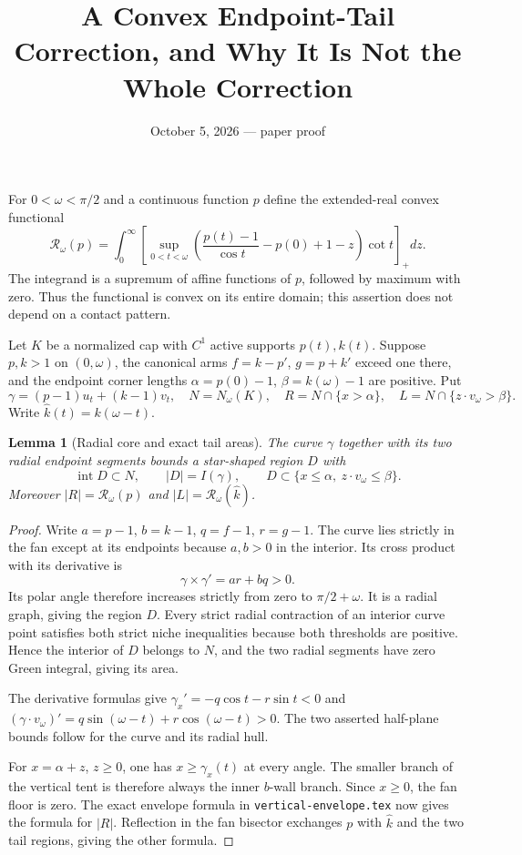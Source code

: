 \documentclass[11pt]{article}
\title{A Convex Endpoint-Tail Correction, and Why It Is Not the Whole Correction}
\author{}\date{October 5, 2026 --- paper proof}
\newtheorem{lemma}{Lemma}
\begin{document}
\maketitle
For $0<\omega<\pi/2$ and a continuous function $p$ define the extended-real convex functional
\[
 \mathcal R_\omega(p)=\int_0^\infty\left[
 \sup_{0<t<\omega}\left(\frac{p(t)-1}{\cos t}-p(0)+1-z\right)\cot t
 \right]_+dz.
\]
The integrand is a supremum of affine functions of $p$, followed by maximum with zero. Thus the functional is convex on its entire domain; this assertion does not depend on a contact pattern.

Let $K$ be a normalized cap with $C^1$ active supports $p(t),k(t)$. Suppose $p,k>1$ on $(0,\omega)$, the canonical arms $f=k-p'$, $g=p+k'$ exceed one there, and the endpoint corner lengths $\alpha=p(0)-1$, $\beta=k(\omega)-1$ are positive. Put
\[
 \gamma=(p-1)u_t+(k-1)v_t,\quad N=N_\omega(K),\quad
 R=N\cap\{x>\alpha\},\quad L=N\cap\{z\cdot v_\omega>\beta\}.
\]
Write $\widehat k(t)=k(\omega-t)$.

\begin{lemma}[Radial core and exact tail areas]
The curve $\gamma$ together with its two radial endpoint segments bounds a star-shaped region $D$ with
\[
 \operatorname{int}D\subset N,\qquad |D|=I(\gamma),\qquad
 D\subset\{x\le\alpha,\ z\cdot v_\omega\le\beta\}.
\]
Moreover $|R|=\mathcal R_\omega(p)$ and $|L|=\mathcal R_\omega(\widehat k)$.
\end{lemma}
\begin{proof}
Write $a=p-1$, $b=k-1$, $q=f-1$, $r=g-1$. The curve lies strictly in the fan except at its endpoints because $a,b>0$ in the interior. Its cross product with its derivative is
\[
 \gamma\times\gamma'=ar+bq>0.
\]
Its polar angle therefore increases strictly from zero to $\pi/2+\omega$. It is a radial graph, giving the region $D$. Every strict radial contraction of an interior curve point satisfies both strict niche inequalities because both thresholds are positive. Hence the interior of $D$ belongs to $N$, and the two radial segments have zero Green integral, giving its area.

The derivative formulas give $\gamma_x'=-q\cos t-r\sin t<0$ and $(\gamma\cdot v_\omega)'=q\sin(\omega-t)+r\cos(\omega-t)>0$. The two asserted half-plane bounds follow for the curve and its radial hull.

For $x=\alpha+z$, $z\ge0$, one has $x\ge\gamma_x(t)$ at every angle. The smaller branch of the vertical tent is therefore always the inner $b$-wall branch. Since $x\ge0$, the fan floor is zero. The exact envelope formula in \texttt{vertical-envelope.tex} now gives the formula for $|R|$. Reflection in the fan bisector exchanges $p$ with $\widehat k$ and the two tail regions, giving the other formula.
\end{proof}
\end{document}
